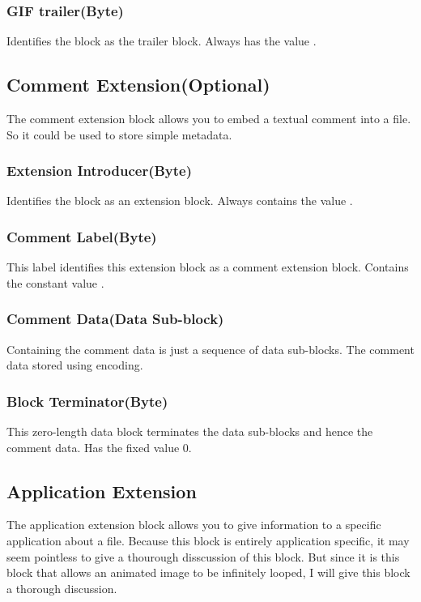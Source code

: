 \subsubsection{GIF trailer(Byte)}

Identifies the block as the trailer block. Always has the value
.

\subsection{Comment Extension(Optional)}

The comment extension block allows you to embed a textual comment into
a \gif file. So it could be used to store simple metadata.

\subsubsection{Extension Introducer(Byte)}

Identifies the block as an extension block. Always contains the
value .

\subsubsection{Comment Label(Byte)}

This label identifies this extension block as a comment extension
block. Contains the constant value .

\subsubsection{Comment Data(Data Sub-block)}

Containing the comment data is just a sequence of data sub-blocks. The
comment data stored using \ascii encoding.

\subsubsection{Block Terminator(Byte)}

This zero-length data block terminates the data sub-blocks and hence
the comment data. Has the fixed value $0$.

\subsection{Application Extension}

The application extension block allows you to give information to a
specific application about a \gif file. Because this block is
entirely application specific, it may seem pointless to give a
thourough disscussion of this block. But since it is this block that
allows an animated \gif image to be infinitely looped, I will give this
block a thorough discussion.

